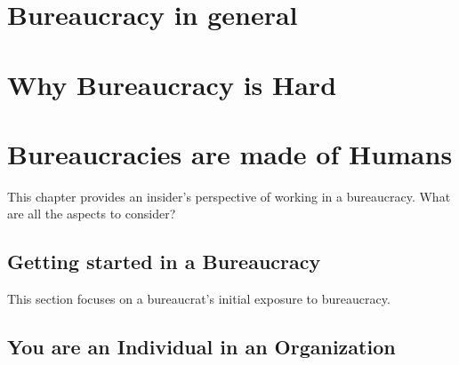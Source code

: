 \documentclass{book}
\begin{document}
    
    
    
     
  \newpage
  \newpage %

\chapter{Bureaucracy in general\label{sec:bureaucracy-in-general}}
   \clearpage
   \clearpage
  
  \clearpage
   \clearpage
   \clearpage

\chapter{Why Bureaucracy is Hard}
  
   \clearpage
   \clearpage


\chapter{Bureaucracies are made of Humans\label{b_made_of_humans}}

This chapter provides an insider's perspective of working in a bureaucracy. What are all the aspects to consider?

  \section{Getting started in a Bureaucracy}
    This section focuses on a bureaucrat's initial exposure to bureaucracy. 
  
    
    
    
    
    
    
    
  \newpage
  \section{You are an Individual in an Organization}
  
\end{document}
